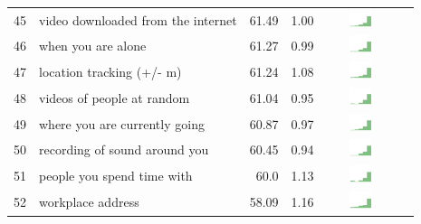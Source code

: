 \begin{table}[t]
\begin{center}
\begin{tabular}{| r | l | r | r | r | r |}
45 & video downloaded from the internet & 61.49 & 1.00 & \includegraphics[width = 2cm, height = 0.5cm]{tex-inputs/table-images/sharedvideosyoudownloadedontheinternetsavedonyourdevicecombined} \\ 
46 & when you are alone & 61.27 & 0.99 & \includegraphics[width = 2cm, height = 0.5cm]{tex-inputs/table-images/learnedwhenandhowmuchyouspendtimealonecombined} \\ 
47 & location tracking (+/- m) & 61.24 & 1.08 & \includegraphics[width = 2cm, height = 0.5cm]{tex-inputs/table-images/trackedwhereyouare(likeaGPS)combined} \\ 
48 & videos of people at random & 61.04 & 0.95 &  \includegraphics[width = 2cm, height = 0.5cm]{tex-inputs/table-images/tookvideosofpeople(withanoutward-facingcamera)atrandomcombined} \\ 
49 & where you are currently going & 60.87 & 0.97 &  \includegraphics[width = 2cm, height = 0.5cm]{tex-inputs/table-images/learnedwhereyouarecurrentlygoingcombined} \\ 
50 & recording of sound around you & 60.45 & 0.94 & \includegraphics[width = 2cm, height = 0.5cm]{tex-inputs/table-images/recordedthesoundaroundyoucombined} \\ 
51 & people you spend time with & 60.0 & 1.13 &  \includegraphics[width = 2cm, height = 0.5cm]{tex-inputs/table-images/learnedwhoyouwerespendingtimewithcombined} \\ 
52 & workplace address & 58.09 & 1.16 &\includegraphics[width = 2cm, height = 0.5cm]{tex-inputs/table-images/learnedwhereyouworksomehowcombined} \\ 

\end{tabular}
\end{center}
\end{table}
